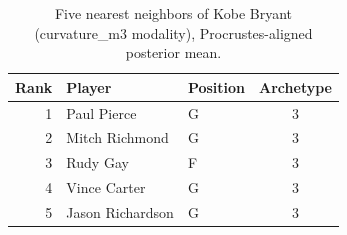 \begin{table}[htbp]
  \centering\small
  \begin{tabular}{rllc}
    \toprule
    Rank & Player & Position & Archetype \\
    \midrule
    1 & Paul Pierce & G & 3 \\
    2 & Mitch Richmond & G & 3 \\
    3 & Rudy Gay & F & 3 \\
    4 & Vince Carter & G & 3 \\
    5 & Jason Richardson & G & 3 \\
    \bottomrule
  \end{tabular}
  \caption{Five nearest neighbors of Kobe Bryant (curvature_m3 modality), Procrustes-aligned posterior mean.}
  \label{tab:Kobe_Bryant_neighbors_curvature_m3}
\end{table}

